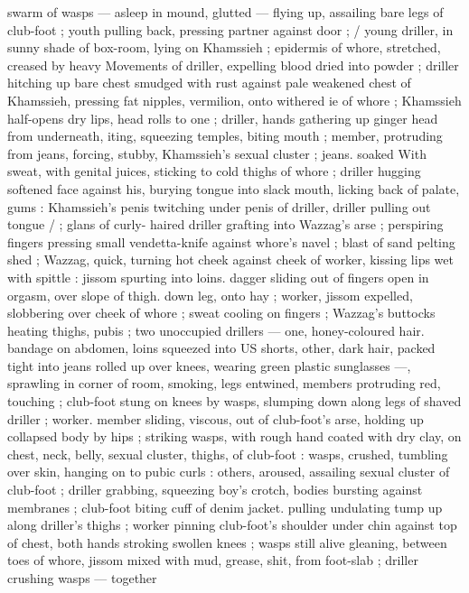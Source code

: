 swarm of wasps --- asleep in mound, glutted --- flying up, assailing 
bare legs of club-foot ; youth pulling back, pressing partner against 
door ; {\slash} young driller, in sunny shade of box-room, lying on 
Khamssieh ; epidermis of whore, stretched, creased by heavy 
Movements of driller, expelling blood dried into powder ; driller 
hitching up bare chest smudged with rust against pale weakened 
chest of Khamssieh, pressing fat nipples, vermilion, onto withered 
ie of whore ; Khamssieh half-opens dry lips, head rolls to one 
; driller, hands gathering up ginger head from underneath, 
iting, squeezing temples, biting mouth ; member, protruding from 
jeans, forcing, stubby, Khamssieh's sexual cluster ; jeans. soaked 
With sweat, with genital juices, sticking to cold thighs of whore ; 
driller hugging softened face against his, burying tongue into slack 
mouth, licking back of palate, gums : Khamssieh's penis twitching 
under penis of driller, driller pulling out tongue {\slash} ; glans of curly- 
haired driller grafting into Wazzag's arse ; perspiring fingers 
pressing small vendetta-knife against whore's navel ; blast of sand 
pelting shed ; Wazzag, quick, turning hot cheek against cheek of 
worker, kissing lips wet with spittle : jissom spurting into loins. 
dagger sliding out of fingers open in orgasm, over slope of thigh. 
down leg, onto hay ; worker, jissom expelled, slobbering over cheek 
of whore ; sweat cooling on fingers ; Wazzag's buttocks heating 
thighs, pubis ; two unoccupied drillers --- one, honey-coloured hair. 
bandage on abdomen, loins squeezed into US shorts, other, dark 
hair, packed tight into jeans rolled up over knees, wearing green 
plastic sunglasses ---, sprawling in corner of room, smoking, legs 
entwined, members protruding red, touching ; club-foot stung on 
knees by wasps, slumping down along legs of shaved driller ; worker. 
member sliding, viscous, out of club-foot's arse, holding up 
collapsed body by hips ; striking wasps, with rough hand coated with 
dry clay, on chest, neck, belly, sexual cluster, thighs, of club-foot : 
wasps, crushed, tumbling over skin, hanging on to pubic curls : 
others, aroused, assailing sexual cluster of club-foot ; driller 
grabbing, squeezing boy's crotch, bodies bursting against 
membranes ; club-foot biting cuff of denim jacket. pulling undulating 
tump up along driller's thighs ; worker pinning club-foot's shoulder 
under chin against top of chest, both hands stroking swollen knees 
; wasps still alive gleaning, between toes of whore, jissom mixed with 
mud, grease, shit, from foot-slab ; driller crushing wasps --- together 
